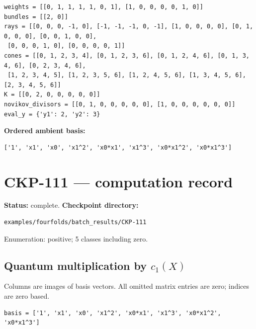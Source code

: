 \documentclass[10pt,a4paper]{article}
\begin{document}
\begin{lstlisting}
weights = [[0, 1, 1, 1, 1, 0, 1], [1, 0, 0, 0, 0, 1, 0]]
bundles = [[2, 0]]
rays = [[0, 0, 0, -1, 0], [-1, -1, -1, 0, -1], [1, 0, 0, 0, 0], [0, 1, 0, 0, 0], [0, 0, 1, 0, 0],
 [0, 0, 0, 1, 0], [0, 0, 0, 0, 1]]
cones = [[0, 1, 2, 3, 4], [0, 1, 2, 3, 6], [0, 1, 2, 4, 6], [0, 1, 3, 4, 6], [0, 2, 3, 4, 6],
 [1, 2, 3, 4, 5], [1, 2, 3, 5, 6], [1, 2, 4, 5, 6], [1, 3, 4, 5, 6], [2, 3, 4, 5, 6]]
K = [[0, 2, 0, 0, 0, 0, 0]]
novikov_divisors = [[0, 1, 0, 0, 0, 0, 0], [1, 0, 0, 0, 0, 0, 0]]
eval_y = {'y1': 2, 'y2': 3}
\end{lstlisting}

\textbf{Ordered ambient basis:}
\begin{lstlisting}
['1', 'x1', 'x0', 'x1^2', 'x0*x1', 'x1^3', 'x0*x1^2', 'x0*x1^3']
\end{lstlisting}

\clearpage\section*{CKP-111 --- computation record}
\textbf{Status:} complete.
\textbf{Checkpoint directory:}
\begin{lstlisting}
examples/fourfolds/batch_results/CKP-111
\end{lstlisting}

Enumeration: positive; 5 classes including zero.
\subsection*{Quantum multiplication by $c_1(X)$}
Columns are images of basis vectors. All omitted matrix entries are zero; indices are zero based.

\begin{lstlisting}
basis = ['1', 'x1', 'x0', 'x1^2', 'x0*x1', 'x1^3', 'x0*x1^2', 'x0*x1^3']
\end{lstlisting}
\end{document}
